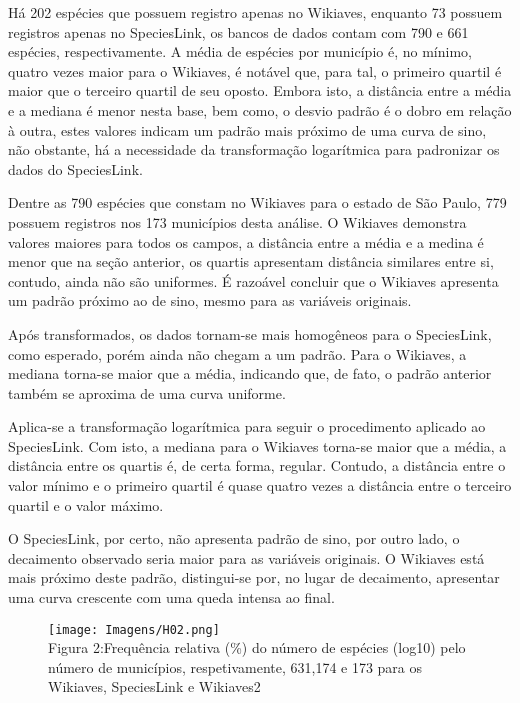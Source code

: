 \documentclass[12pt]{extarticle}
\newenvironment{resposta}{ \color{mygray}}{}
\begin{document}
\begin{resposta}
Há 202 espécies que possuem registro apenas no Wikiaves, enquanto 73 possuem registros apenas no SpeciesLink, os bancos de dados contam com 790 e 661 espécies, respectivamente. A média de espécies por município é, no mínimo, quatro vezes maior para o Wikiaves, é notável que, para tal, o primeiro quartil é maior que o terceiro quartil de seu oposto. Embora isto, a distância entre a média e a mediana é menor nesta base, bem como, o desvio padrão é o dobro em relação à outra, estes valores indicam um padrão mais próximo de uma curva de sino, não obstante, há a necessidade da transformação logarítmica para padronizar os dados do SpeciesLink.

Dentre as 790 espécies que constam no Wikiaves para o estado de São Paulo, 779 possuem registros nos 173 municípios desta análise. O Wikiaves demonstra valores maiores para todos os campos, a distância entre a média e a medina é menor que na seção anterior, os quartis apresentam distância similares entre si, contudo, ainda não são uniformes. É razoável concluir que o Wikiaves apresenta um padrão próximo ao de sino, mesmo para as variáveis originais.

Após transformados, os dados tornam-se mais homogêneos para o SpeciesLink, como esperado, porém ainda não chegam a um padrão. Para o Wikiaves, a mediana torna-se maior que a média, indicando que, de fato, o padrão anterior também se aproxima de uma curva uniforme.

Aplica-se a transformação logarítmica para seguir o procedimento aplicado ao SpeciesLink. Com isto, a mediana para o Wikiaves torna-se maior que a média, a distância entre os quartis é, de certa forma, regular. Contudo, a distância entre o valor mínimo e o primeiro quartil é quase quatro vezes a distância entre o terceiro quartil e o valor máximo.

O SpeciesLink, por certo, não apresenta padrão de sino, por outro lado, o decaimento observado seria maior para as variáveis originais. O Wikiaves está mais próximo deste padrão, distingui-se por, no lugar de decaimento, apresentar uma curva crescente com uma queda intensa ao final.
\end{resposta}



\begin{figure}[h!]
\centering
\texttt{[image: Imagens/H02.png]}
\\{\scriptsize Figura 2:Frequência relativa (\%) do número de espécies (log10) pelo número de municípios, respetivamente, 631,174 e 173 para os Wikiaves, SpeciesLink e Wikiaves2  }
\end{figure}
\end{document}
